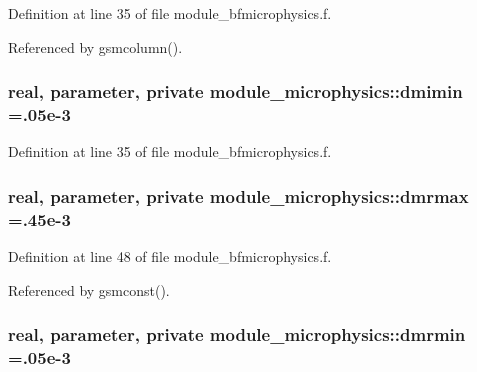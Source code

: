 Definition at line 35 of file module\+\_\+bfmicrophysics.\+f.



Referenced by gsmcolumn().

\subsubsection[{\texorpdfstring{dmimin}{dmimin}}]{\setlength{\rightskip}{0pt plus 5cm}real, parameter, private module\+\_\+microphysics\+::dmimin =.\+05e-\/3\hspace{0.3cm}{\ttfamily [private]}}\hypertarget{namespacemodule__microphysics_a10a6db795f339c47c5afd6916d0c196b}{}\label{namespacemodule__microphysics_a10a6db795f339c47c5afd6916d0c196b}


Definition at line 35 of file module\+\_\+bfmicrophysics.\+f.

\subsubsection[{\texorpdfstring{dmrmax}{dmrmax}}]{\setlength{\rightskip}{0pt plus 5cm}real, parameter, private module\+\_\+microphysics\+::dmrmax =.\+45e-\/3\hspace{0.3cm}{\ttfamily [private]}}\hypertarget{namespacemodule__microphysics_a5faae0c4f54f72f04b2874f5588276f5}{}\label{namespacemodule__microphysics_a5faae0c4f54f72f04b2874f5588276f5}


Definition at line 48 of file module\+\_\+bfmicrophysics.\+f.



Referenced by gsmconst().

\subsubsection[{\texorpdfstring{dmrmin}{dmrmin}}]{\setlength{\rightskip}{0pt plus 5cm}real, parameter, private module\+\_\+microphysics\+::dmrmin =.\+05e-\/3\hspace{0.3cm}{\ttfamily [private]}}\hypertarget{namespacemodule__microphysics_a67a841cda9f172633fa4895d1a3433e7}{}\label{namespacemodule__microphysics_a67a841cda9f172633fa4895d1a3433e7}


